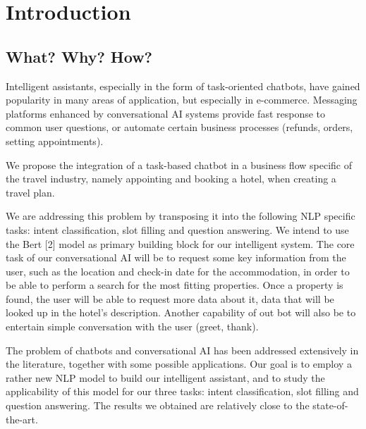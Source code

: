 \documentclass[runningheads,a4paper,11pt]{report}
\begin{document}
\tableofcontents

\newpage

\listoftables
\listoffigures
\listofalgorithms

\newpage




\newpage



 


\chapter{Introduction}
\label{chapter:introduction}

\section{What? Why? How?}
\label{section:what}

    Intelligent assistants, especially in the form of task-oriented chatbots, have gained popularity in many areas of application, but especially in e-commerce. 
Messaging platforms enhanced by conversational AI systems provide fast response to common user questions, or automate certain business processes (refunds, orders, setting appointments). 

We propose the integration of a task-based chatbot in a business flow specific of the travel industry, namely appointing and booking a hotel, when creating a travel plan.

We are addressing this problem by transposing it into the following NLP specific tasks: intent classification, slot filling and question answering. We intend to use the Bert [2] model as primary building block for our intelligent system. 
The core task of our conversational AI will be to request some key information from the user, such as the location and check-in date for the accommodation, in order to be able to perform a search for the most fitting properties. Once a property is found, the user will be able to request more data about it, data that will be looked up in the hotel's description. Another capability of out bot will also be to entertain simple conversation with the user (greet, thank).

The problem of chatbots and conversational AI has been addressed extensively in the literature, together with some possible applications. Our goal is to employ a rather new NLP model to build our intelligent assistant, and to study the applicability of this model for our three tasks: intent classification, slot filling and question answering. The results we obtained are relatively close to the state-of-the-art.
\end{document}
